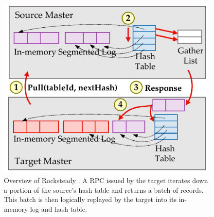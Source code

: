 \begin{figure}[t]
\centering
\includegraphics[width=0.70\columnwidth]{figures/rocksteady-overview.pdf}
\caption{Overview of Rocksteady \pulls. A \pull RPC issued by the target
    iterates down a portion of the source's hash table and returns a
    batch of records. This batch is then logically replayed by the
    target into its in-memory log and hash table.}
\label{fig:migration-overview}
\end{figure}
